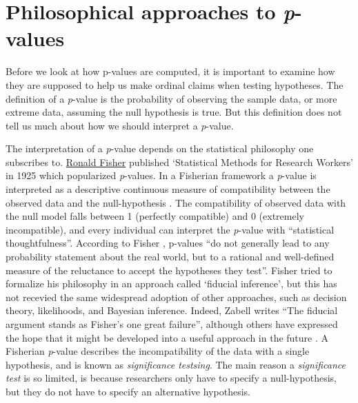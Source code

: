 \documentclass[
]{krantz}
\begin{document}
\hypertarget{philosophical-approaches-to-p-values}{%
\section{\texorpdfstring{Philosophical approaches to \emph{p}-values}{Philosophical approaches to p-values}}\label{philosophical-approaches-to-p-values}}

Before we look at how p-values are computed, it is important to examine how they are supposed to help us make ordinal claims when testing hypotheses. The definition of a \emph{p}-value is the probability of observing the sample data, or more extreme data, assuming the null hypothesis is true. But this definition does not tell us much about how we should interpret a \emph{p}-value.

The interpretation of a \emph{p}-value depends on the statistical philosophy one subscribes to. \href{https://en.wikipedia.org/wiki/Ronald_Fisher}{Ronald Fisher} published `Statistical Methods for Research Workers' in 1925 which popularized \emph{p}-values. In a Fisherian framework a \emph{p}-value is interpreted as a descriptive continuous measure of compatibility between the observed data and the null-hypothesis \citep{greenland_statistical_2016}. The compatibility of observed data with the null model falls between 1 (perfectly compatible) and 0 (extremely incompatible), and every individual can interpret the \emph{p}-value with ``statistical thoughtfulness''. According to Fisher \citeyearpar{fisher_statistical_1956}, p-values ``do not generally lead to any probability statement about the real world, but to a rational and well-defined measure of the reluctance to accept the hypotheses they test''. Fisher tried to formalize his philosophy in an approach called `fiducial inference', but this has not recevied the same widespread adoption of other approaches, such as decision theory, likelihoods, and Bayesian inference. Indeed, Zabell \citeyearpar{zabell_r_1992} writes ``The fiducial argument stands as Fisher's one great failure'', although others have expressed the hope that it might be developed into a useful approach in the future \citep{schweder_confidence_2016}. A Fisherian \emph{p}-value describes the incompatibility of the data with a single hypothesis, and is known as \emph{significance testsing}. The main reason a \emph{significance test} is so limited, is because researchers only have to specify a null-hypothesis, but they do not have to specify an alternative hypothesis.
\end{document}
